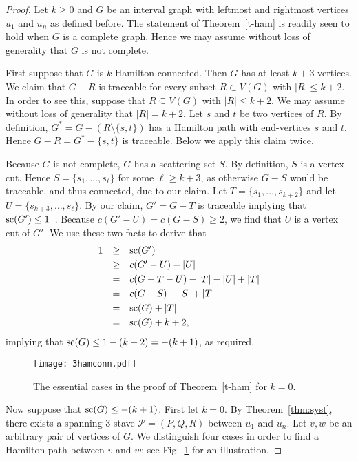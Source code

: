 \documentclass{llncs}
\DeclareMathOperator{\scat}{{\rm sc}}
\newcommand{\cP}{{\mathcal P}}
\begin{document}
\begin{proof}
Let  $k\geq 0$ and $G$ be an interval graph
with leftmost and rightmost vertices $u_1$ and $u_n$ as defined before. The statement of Theorem~\ref{t-ham} is readily seen to hold when $G$ is a complete graph.
Hence we may assume without loss of generality that $G$ is not complete.

First suppose that $G$ is $k$-Hamilton-connected. Then $G$ has at least $k+3$ vertices.
We claim that $G-R$ is traceable for every subset $R\subset V(G)$ with $|R|\leq k+2$.
In order to see this, suppose that $R\subseteq V(G)$ with $|R|\leq k+2$.
We may assume without loss of generality that $|R|=k+2$.
Let $s$ and $t$ be two vertices of $R$. By definition, $G^*=G-(R\setminus \{s,t\})$ has a Hamilton path with end-vertices $s$ and $t$. 
Hence $G-R=G^*-\{s,t\}$ is traceable. Below we apply this claim twice.

Because $G$ is not complete, $G$ has a scattering set $S$. By definition, $S$ is a vertex cut. Hence $S=\{s_1,\ldots,s_\ell\}$ for some $\ell\geq k+3$, as otherwise
$G-S$ would be traceable, and thus connected, due to our claim. 
Let $T=\{s_1,\ldots,s_{k+2}\}$ and let $U=\{s_{k+3},\ldots,s_\ell\}$.
By our claim, $G'=G-T$ is traceable implying that $\scat(G')\leq 1$~\cite{SCH92}.
Because $c(G'-U)=c(G-S)\geq 2$, we find that $U$ is a vertex cut of $G'$. We use these two facts to derive that
\[
\begin{array}{lcl}
1 &\geq &\scat(G')\\[3pt]
   &\geq &c(G'-U)-|U|\\[3pt]
   &=&c(G-T-U)-|T|-|U|+|T|\\[3pt]
   &= &c(G-S)-|S|+|T|\\[3pt]
   &= &\scat(G)+|T|\\[3pt]
   &=&\scat(G)+k+2,
\end{array}
\]
implying that $\scat(G)\leq 1-(k+2)=-(k+1)$, as required.

\begin{figure}
\begin{center}
\texttt{[image: 3hamconn.pdf]}
\end{center}
\caption{The essential cases in the proof of Theorem~\ref{t-ham} for $k=0$.}\label{fig:3hamconn}
\end{figure}

Now suppose that $\scat(G)\leq -(k+1)$. 
First let $k=0$.
By Theorem~\ref{thm:syst}, there exists a spanning 3-stave $\cP=(P,Q,R)$ between $u_1$ and $u_n$. 
Let $v,w$ be an arbitrary pair of vertices  of $G$. We distinguish four cases in order to find a Hamilton path between $v$ and $w$; see Fig.~\ref{fig:3hamconn} for an illustration.


\end{proof}
\end{document}
